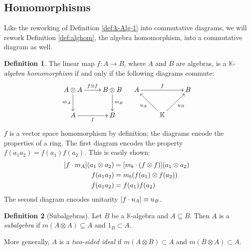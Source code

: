 \documentclass{article}
\theoremstyle{definition}
\newtheorem{Definition}{Definition}
\theoremstyle{remark}
\theoremstyle{underline}
\theoremstyle{underline}
\begin{document}
	\subsection{Homomorphisms}
	Like the reworking of Definition \ref{def:k-Alg-1} into commutative diagrams, we will rework Definition \ref{def:alghom}, the algebra homomorphism, into a commutative diagram as well.

	\begin{Definition}
		The linear map $f\colon A \to B$, where $A$ and $B$ are algebras, is a $\mathbb K$-\emph{algebra homomorphism} if and only if the following diagrams commute:
		\begin{align*}
			\xymatrix{
				A \otimes A \ar[r]^-{f \otimes f} \ar[d]_-{m_A} & B \otimes B \ar[d]^-{m_B}  \\
				A  \ar[r]_-{f} & B
			} & & 
			\xymatrix{
				A \ar[rr]^-{f} & & B \\
				& \mathbb K \ar[lu]^-{u_{A}} \ar[ru]_-{u_B} & 
			}
		\end{align*}
		$f$ is a vector space homomorphism by definition; the diagrams encode the properties of a ring. The first diagram encodes the property $f(a_1 a_2) = f(a_1)f(a_2)$. This is easily shown:
		\begin{align*}
			 \bqty{f\cdot m_A}\pqty{a_1 \otimes a_2} & = \bqty{m_b\cdot(f \otimes f)}\pqty{a_1 \otimes a_2} \\
			 f\pqty{a_1 a_2} & = m_b\pqty{f(a_1) \otimes f(a_2)} \\
			 f\pqty{a_1 a_2} & = f(a_1)f(a_2) 
		\end{align*}
		The second diagram encodes unitarity $\bqty{f\cdot u_A} \equiv u_B$.
	\end{Definition}
	
	\begin{Definition}[Subalgebras]
		Let $B$ be a $\mathbb K$-algebra and $A \subseteq B$. Then $A$ is a \emph{subalgebra} if $m(A \otimes A) \subseteq A$ and $1_{B} \subset A$.
	\end{Definition}
	More generally, $A$ is a \emph{two-sided ideal} if $m(A \otimes B) \subset A$ and $m(B \otimes A) \subset A$. 
\end{document}

